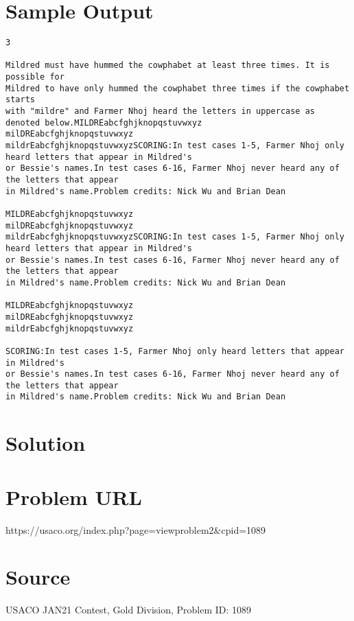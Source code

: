 \documentclass[12pt]{article}
\begin{document}
\section*{Sample Output}
\begin{verbatim}
3

Mildred must have hummed the cowphabet at least three times. It is possible for
Mildred to have only hummed the cowphabet three times if the cowphabet starts
with "mildre" and Farmer Nhoj heard the letters in uppercase as denoted below.MILDREabcfghjknopqstuvwxyz
milDREabcfghjknopqstuvwxyz
mildrEabcfghjknopqstuvwxyzSCORING:In test cases 1-5, Farmer Nhoj only heard letters that appear in Mildred's
or Bessie's names.In test cases 6-16, Farmer Nhoj never heard any of the letters that appear
in Mildred's name.Problem credits: Nick Wu and Brian Dean

MILDREabcfghjknopqstuvwxyz
milDREabcfghjknopqstuvwxyz
mildrEabcfghjknopqstuvwxyzSCORING:In test cases 1-5, Farmer Nhoj only heard letters that appear in Mildred's
or Bessie's names.In test cases 6-16, Farmer Nhoj never heard any of the letters that appear
in Mildred's name.Problem credits: Nick Wu and Brian Dean

MILDREabcfghjknopqstuvwxyz
milDREabcfghjknopqstuvwxyz
mildrEabcfghjknopqstuvwxyz

SCORING:In test cases 1-5, Farmer Nhoj only heard letters that appear in Mildred's
or Bessie's names.In test cases 6-16, Farmer Nhoj never heard any of the letters that appear
in Mildred's name.Problem credits: Nick Wu and Brian Dean
\end{verbatim}

\section*{Solution}


\section*{Problem URL}
https://usaco.org/index.php?page=viewproblem2&cpid=1089

\section*{Source}
USACO JAN21 Contest, Gold Division, Problem ID: 1089
\end{document}
